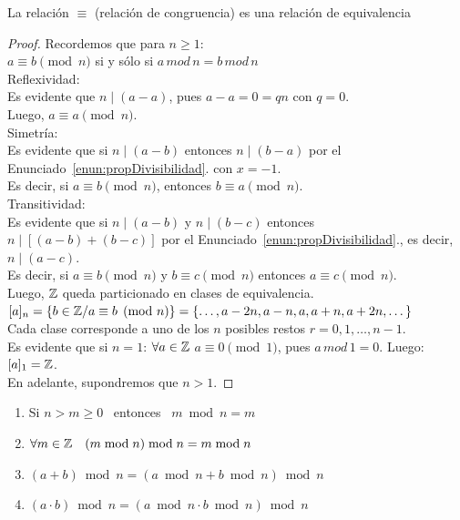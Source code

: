 \begin{enunciado} \label{enun:congrEquiv}\leavevmode\par
La relación $\equiv$ (relación de congruencia) es una relación de equivalencia
\end{enunciado}

\begin{proof}
Recordemos que para $n\geq 1$: \\
$a \equiv b \pmod n$ si y sólo si $a \, mod \, n = b \, mod \, n$ \\
Reflexividad: \\
Es evidente que $n \mid (a-a)$, pues $a-a = 0 = qn$ con $q=0$. \\
Luego, $a \equiv a \pmod n$. \\
Simetría: \\
\setcounter{enumi}{3}
Es evidente que si $n \mid (a-b)$ entonces $n \mid (b-a)$ por el Enunciado~\ref{enun:propDivisibilidad}. con $x=-1$. \\
Es decir, si $a \equiv b \pmod n$, entonces  $b \equiv a \pmod n$. \\
Transitividad: \\
\setcounter{enumi}{1}
Es evidente que si $n \mid(a-b)$ y $n \mid(b-c)$ entonces $n \mid [(a-b)+ (b-c)]$ por el Enunciado~\ref{enun:propDivisibilidad}., es decir, $n \mid (a-c)$. \\
Es decir, si $a \equiv b \pmod n$ y $b \equiv c \pmod n$
entonces $a \equiv c \pmod n$. \\
Luego, $\mathbb{Z}$  queda particionado en clases de equivalencia.\\
$[a]_n = \{ b \in \mathbb{Z} / a \equiv b \pmod n\} = \{\dots, a - 2n, a - n, a, a + n, a + 2n, \dots \}$ \\
Cada clase corresponde a uno de los $n$ posibles restos $r = 0, 1, \dots , n-1$. \\
Es evidente que si $n=1$: $\forall a \in \mathbb{Z} $  $a \equiv 0 \pmod 1$, pues $a \, mod \, 1 = 0$. Luego: \\
$[a]_1= \mathbb{Z}$. \\
En adelante, supondremos que $n>1$.
\end{proof}

\begin{enunciado} \label{enun:propMod}\leavevmode\par
\begin{enumerate}[label=\roman*)]
\item Si $n > m \geq 0$ \, entonces \, $m \bmod n = m$  
\item $\forall m \in \mathbb{Z} \quad (m \bmod n) \bmod n = m \bmod n$ 
\item $(a+b) \bmod n = (a \bmod n + b \bmod n) \bmod n$
\item $ (a \cdot b) \bmod n = (a \bmod n \cdot b \bmod n) \bmod n$
\end{enumerate}
\end{enunciado}

